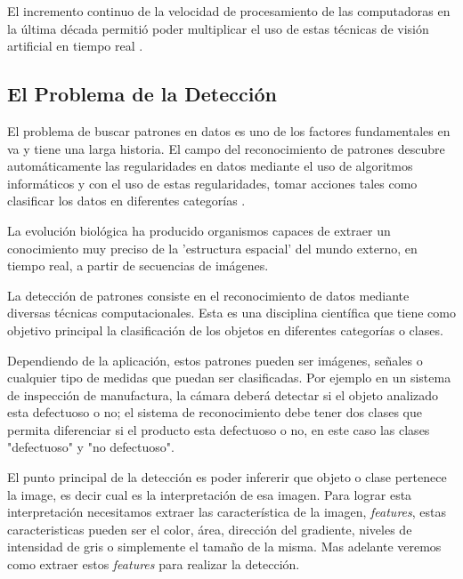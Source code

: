 El incremento continuo de la velocidad de procesamiento de las computadoras en la última década permitió poder multiplicar el uso de estas técnicas de visión artificial en tiempo real \citep{Naill}. 

\subsection{El Problema de la Detección}\label{sub:problemadeteccion}
El problema de buscar patrones en datos es uno de los factores fundamentales en \ac{va} y tiene una larga historia. El campo del reconocimiento de patrones  descubre automáticamente las regularidades en datos mediante el uso de algoritmos informáticos y con el uso de estas regularidades, tomar acciones tales como clasificar los datos en diferentes categorías \citep{bishop}. 
\begin{center}
\begin{minipage}{0.8\linewidth}  \vspace{5pt} {\small
La evolución biológica ha producido organismos capaces de extraer un conocimiento muy preciso de la 'estructura espacial' del mundo externo, en tiempo real, a partir de secuencias de imágenes.}
\begin{flushright}
 \citep{percepcion}
\end{flushright}
\end{minipage}
\end{center}

La detección de patrones consiste en el reconocimiento de datos mediante diversas técnicas computacionales. Esta es una disciplina científica que tiene como objetivo principal la clasificación de los objetos en diferentes categorías o clases.

Dependiendo de la aplicación, estos patrones pueden ser imágenes, señales o cualquier tipo de medidas que puedan ser clasificadas. Por ejemplo en un sistema de inspección de manufactura, la cámara deberá detectar si el objeto analizado esta defectuoso o no; el sistema de reconocimiento debe tener dos clases que permita diferenciar si el producto esta defectuoso o no, en este caso las clases "defectuoso" y "no defectuoso".

El punto principal de la detección es poder infererir que objeto o clase pertenece la image, es decir cual es la interpretación de esa imagen. Para lograr esta interpretación necesitamos extraer las característica de la imagen, \textit{features}, estas caracteristicas pueden ser el color, área, dirección del gradiente, niveles de intensidad de gris o simplemente el tamaño de la misma. Mas adelante veremos como extraer estos \textit{features} para realizar la detección.

